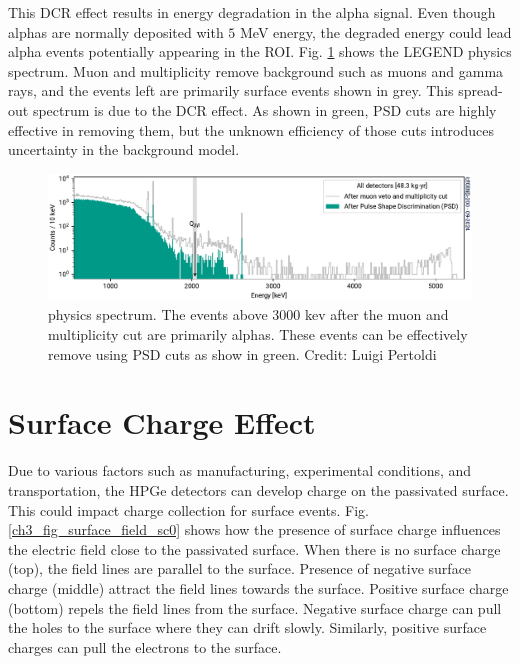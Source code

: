  This DCR effect results in energy degradation in the alpha signal. Even though alphas are normally deposited with $5$ MeV energy, the degraded energy could lead alpha events potentially appearing in the ROI. Fig. \ref{ch3_fig_L200_surface_background} shows the LEGEND physics spectrum. Muon and multiplicity remove background such as muons and gamma rays, and the events left are primarily surface events shown in grey. This spread-out spectrum is due to the DCR effect. As shown in green, PSD cuts are highly effective in removing them, but the unknown efficiency of those cuts introduces uncertainty in the background model. 

  \begin{figure}[!htb]
\centering
  \includegraphics[width=0.99\linewidth]{ch2/figs/l200-phy-spectrum-psd.pdf}
  \caption{{\Ltwo} physics spectrum. The events above 3000 kev after the muon and multiplicity cut are primarily alphas. These events can be effectively remove using PSD cuts as show in green. Credit: Luigi Pertoldi}
\label{ch3_fig_L200_surface_background}
  \end{figure}

\section{Surface Charge Effect}
Due to various factors such as manufacturing, experimental conditions, and transportation, the HPGe detectors can develop charge on the passivated surface. This could impact charge collection for surface events. Fig. \ref{ch3_fig_surface_field_sc0} shows how the presence of surface charge influences the electric field close to the passivated surface. When there is no surface charge (top), the field lines are parallel to the surface. Presence of negative surface charge (middle) attract the field lines towards the surface. Positive surface charge (bottom) repels the field lines from the surface. Negative surface charge can pull the holes to the surface where they can drift slowly. Similarly, positive surface charges can pull the electrons to the surface.

